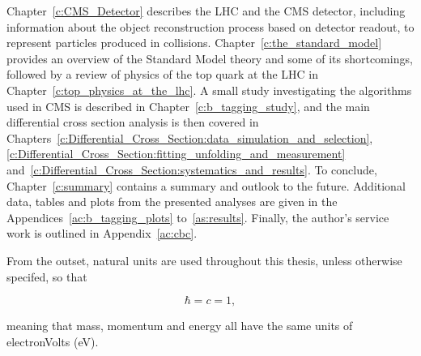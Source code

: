 Chapter~\ref{c:CMS_Detector} describes the LHC and the CMS detector, including information about the object
reconstruction process based on detector readout, to represent particles produced in collisions.
Chapter~\ref{c:the_standard_model} provides an overview of the Standard Model theory and some of its
shortcomings, followed by a review of physics of the top quark at the LHC in
Chapter~\ref{c:top_physics_at_the_lhc}. A small study investigating the \btagging algorithms used in CMS is
described in Chapter~\ref{c:b_tagging_study}, and the main \ttbar differential cross section analysis is then
covered in Chapters~\ref{c:Differential_Cross_Section:data_simulation_and_selection},
\ref{c:Differential_Cross_Section:fitting_unfolding_and_measurement}
and~\ref{c:Differential_Cross_Section:systematics_and_results}. To conclude, Chapter~\ref{c:summary} contains
a summary and outlook to the future. Additional data, tables and plots from the presented analyses are given
in the Appendices~\ref{ac:b_tagging_plots} to~\ref{as:results}. Finally, the author's service work is outlined
in Appendix~\ref{ac:cbc}.

From the outset, natural units are used throughout this thesis, unless otherwise specifed, so that

\begin{equation}
\hbar = c = 1,
\end{equation}

meaning that mass, momentum and energy all have the same units of electronVolts (eV).